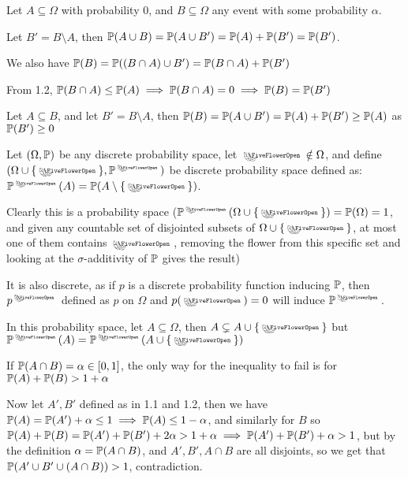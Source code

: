 \maketitle
\begin{cExercise}
	\begin{cPart}
		
		Let $A\subseteq \Omega$ with probability $0$, and $B\subseteq \Omega$ any event with some probability $\alpha$.
		
		Let $B'=B\setminus A$, then $\P(A\cup B)=\P(A\cup B')=\P(A)+\P(B')=\P(B')$.
		
		We also have $\P(B)=\P((B\cap A)\cup B')=\P(B\cap A)+\P(B')$
		
		From 1.2, $\P(B\cap A)\le\P(A)\implies \P(B\cap A)=0\implies \P(B)=\P(B')$
		
	\end{cPart}
	\begin{cPart}
		Let $A\subseteq B$, and let $B'=B\setminus A$, then $\P(B)=\P(A\cup B')=\P(A)+\P(B')\ge \P(A)$ as $\P(B')\ge 0$
		
	\end{cPart}
	\begin{cPart}
		Let $(\Omega, \P)$ be any discrete probability space, let $\flower\notin \Omega$, and define $(\Omega\cup\{\flower\}, \P^{\flower})$ be discrete probability space defined as: $\P^{\flower}(A)=\P(A\setminus\{\flower\})$.
		
		Clearly this is a probability space ($\P^{\flower}(\Omega\cup\{\flower\})=\P(\Omega)=1$, and given any countable set of disjointed subsets of $\Omega\cup\{\flower\}$, at most one of them contains $\flower$, removing the flower from this specific set and looking at the $\sigma$-additivity of $\P$ gives the result)
		
		It is also discrete, as if $p$ is a discrete probability function inducing $\P$, then $p^{\flower}$ defined as $p$ on $\Omega$ and $p(\flower)=0$ will induce $\P^{\flower}$.
		
		In this probability space, let $A\subseteq\Omega$, then $A\subsetneq A\cup\{\flower\}$ but $\P^{\flower}(A)=\P^{\flower}(A\cup\{\flower\})$
	\end{cPart}
	\begin{cPart}
		If $\P(A\cap B)=\alpha\in[0,1]$, the only way for the inequality to fail is for $\P(A)+\P(B)>1+\alpha$
		
		Now let $A',B'$ defined as in 1.1 and 1.2, then we have $\P(A)=\P(A')+\alpha\le 1\implies \P(A)\le 1-\alpha$, and similarly for $B$ so $\P(A)+\P(B)=\P(A')+\P(B')+2\alpha>1+\alpha\implies \P(A')+\P(B')+\alpha>1$, but by the definition $\alpha=\P(A\cap B)$, and $A',B',A\cap B$ are all disjoints, so we get that $\P(A'\cup B'\cup (A\cap B))>1$, contradiction.
		

\end{cPart}
\end{cExercise}
